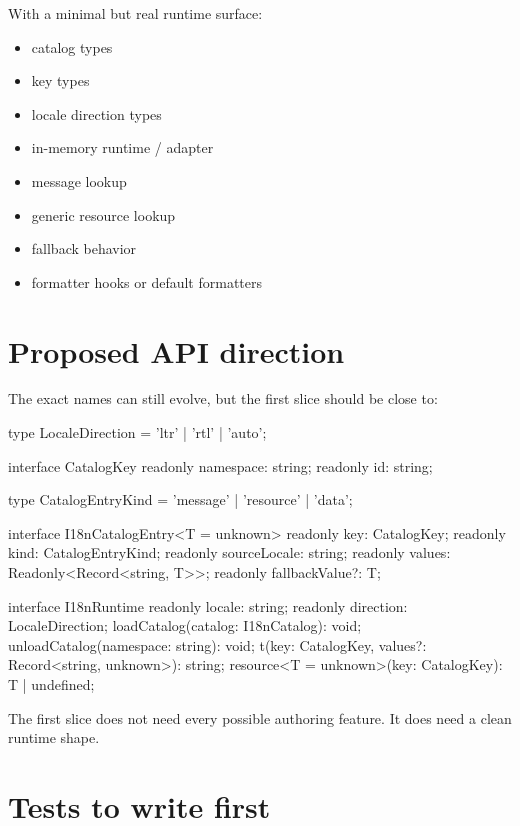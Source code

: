 With a minimal but real runtime surface:

\begin{itemize}
\tightlist
\item
  catalog types
\item
  key types
\item
  locale direction types
\item
  in-memory runtime / adapter
\item
  message lookup
\item
  generic resource lookup
\item
  fallback behavior
\item
  formatter hooks or default formatters
\end{itemize}

\section{Proposed API direction}\label{record-188-proposed-api-direction}

The exact names can still evolve, but the first slice should be close to:

\begin{CodeBlock}
type LocaleDirection = 'ltr' | 'rtl' | 'auto';

interface CatalogKey {
  readonly namespace: string;
  readonly id: string;
}

type CatalogEntryKind = 'message' | 'resource' | 'data';

interface I18nCatalogEntry<T = unknown> {
  readonly key: CatalogKey;
  readonly kind: CatalogEntryKind;
  readonly sourceLocale: string;
  readonly values: Readonly<Record<string, T>>;
  readonly fallbackValue?: T;
}

interface I18nRuntime {
  readonly locale: string;
  readonly direction: LocaleDirection;
  loadCatalog(catalog: I18nCatalog): void;
  unloadCatalog(namespace: string): void;
  t(key: CatalogKey, values?: Record<string, unknown>): string;
  resource<T = unknown>(key: CatalogKey): T | undefined;
}
\end{CodeBlock}

The first slice does not need every possible authoring feature. It does need a clean runtime shape.

\section{Tests to write first}\label{record-188-tests-to-write-first}


